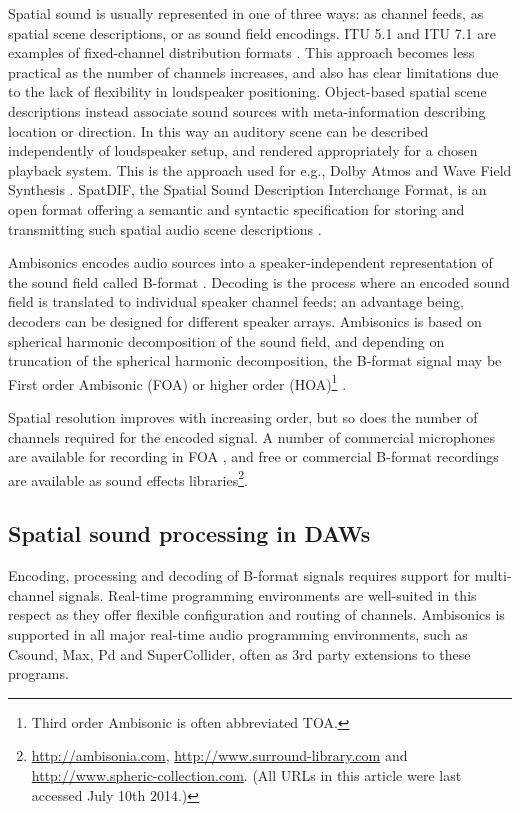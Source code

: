 \documentclass{article}
\begin{document}
Spatial sound is usually represented in one of three ways: as channel feeds, as spatial scene descriptions, or as sound field encodings.
ITU 5.1 and ITU 7.1 are examples of fixed-channel distribution formats \cite{ITU:1993_surround_5:1}.
This approach becomes less practical as the number of channels increases, and also has clear limitations due to the lack of flexibility in loudspeaker positioning.
Object-based spatial scene descriptions instead associate sound sources with meta-information describing location or direction. In this way an auditory scene can be described independently of loudspeaker setup, and rendered appropriately for a chosen playback system.
This is the approach used for e.g., Dolby Atmos and Wave Field Synthesis \cite{dolby:2014atmos,Berkhout:1993wfs}.
SpatDIF, the Spatial Sound Description Interchange Format, is an open format offering a semantic and syntactic specification for storing and transmitting such spatial audio scene descriptions \cite{Peters:2013spatdif}.

Ambisonics encodes audio sources into a speaker-inde\-pendent representation of the sound field called B-format \cite{gerzon:1985JAES}.
Decoding is the process where an encoded sound field is translated to individual speaker channel feeds; an advantage being,  decoders can be designed for different speak\-er arrays.
Ambisonics is based on spherical harmonic decomposition of the sound field, and depending on truncation of the spherical harmonic decomposition, 
the B-for\-mat signal may be First order Ambisonic (FOA) or higher order (HOA)\footnote{Third order Ambisonic is often abbreviated TOA.} \cite{daniel:2001phd}.

Spatial resolution improves with increasing order, but so does the number of channels required for the encoded signal.
A number of commercial microphones are available for recording in FOA \cite{farrar:1979soundfield}, and free or commercial B-format recordings are available as sound effects libraries\footnote{\href{http://ambisonia.com}{http://ambisonia.com}, \href{http://www.surround-library.com}{http://www.surround-library.com} and \href{http://www.spheric-collection.com}{http://www.spheric-collection.com}. (All URLs in this article were last accessed July 10th 2014.)}.


\subsection{Spatial sound processing in DAWs}\label{sec:daws}

Encoding, processing and decoding of B-format signals requires support for multi-channel signals.
Real-time programming environments are well-suited in this respect as they offer flexible configuration and routing of channels. Ambisonics is supported in all major real-time audio programming environments, such as Csound, Max, Pd and SuperCollider, often as 3rd party extensions to these programs.
\end{document}
